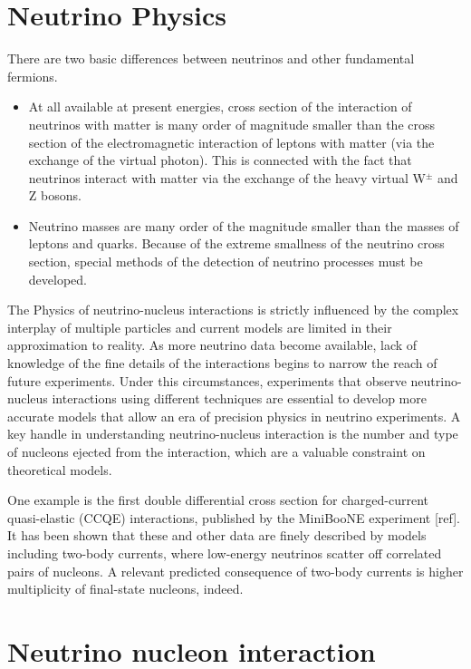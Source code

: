 \section{Neutrino Physics}
\label{sec:1.1}
There are two basic differences between neutrinos and other fundamental fermions.
\begin{itemize}
  \item At all available at present energies, cross section of the interaction of neutrinos %
    with matter is many order of magnitude smaller than the cross section of the %
    electromagnetic interaction of leptons with matter (via the exchange of the virtual %
    photon).
    This is connected with the fact that neutrinos interact with matter via %
    the exchange of the heavy virtual W$^\pm$ and Z bosons.
  \item Neutrino masses are many order of the magnitude smaller than the masses of %
    leptons and quarks.
    Because of the extreme smallness of the neutrino cross section, special methods %
    of the detection of neutrino processes must be developed.
\end{itemize}

The Physics of neutrino-nucleus interactions is strictly influenced by the complex interplay %
of multiple particles and current models are limited in their approximation to reality.
As more neutrino data become available, lack of knowledge of the fine details of the %
interactions begins to narrow the reach of future experiments.
Under this circumstances, experiments that observe neutrino-nucleus interactions using %
different techniques are essential to develop more accurate models that allow an era of %
precision physics in neutrino experiments.
A key handle in understanding neutrino-nucleus interaction is the number and type of nucleons
ejected from the interaction, which are a valuable constraint on theoretical models.

One example is the first double differential cross section for charged-current quasi-elastic %
(CCQE) interactions, published by the MiniBooNE experiment [ref].
It has been shown that these and other data are finely described by models including %
two-body currents, where low-energy neutrinos scatter off correlated pairs of nucleons.
A relevant predicted consequence of two-body currents is higher multiplicity of %
final-state nucleons, indeed.


\section{Neutrino nucleon interaction}
\label{sec:1.2}
